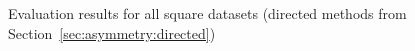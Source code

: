 Evaluation results for all square datasets (directed methods from Section~\ref{sec:asymmetry:directed})
